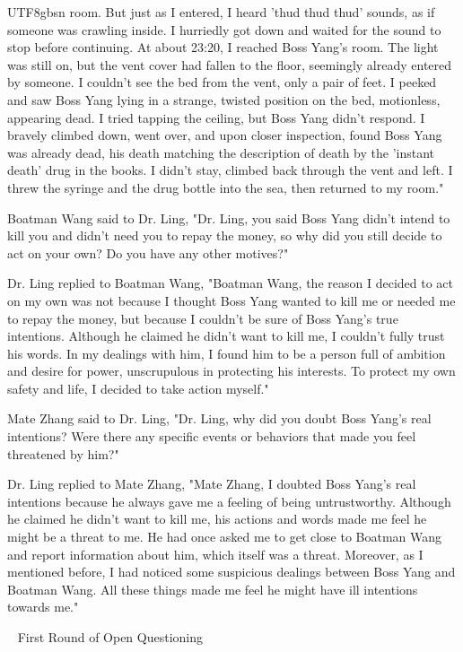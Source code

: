 \documentclass[11pt]{article}
\begin{document}
{\begin{CJK}{UTF8}{gbsn}
room. But just as I entered, I heard 'thud thud thud' sounds, as if someone was crawling inside. I hurriedly got down and waited for the sound to stop before continuing. At about 23:20, I reached Boss Yang's room. The light was still on, but the vent cover had fallen to the floor, seemingly already entered by someone. I couldn’t see the bed from the vent, only a pair of feet. I peeked and saw Boss Yang lying in a strange, twisted position on the bed, motionless, appearing dead. I tried tapping the ceiling, but Boss Yang didn’t respond. I bravely climbed down, went over, and upon closer inspection, found Boss Yang was already dead, his death matching the description of death by the 'instant death' drug in the books. I didn’t stay, climbed back through the vent and left. I threw the syringe and the drug bottle into the sea, then returned to my room."

Boatman Wang said to Dr. Ling, "Dr. Ling, you said Boss Yang didn’t intend to kill you and didn’t need you to repay the money, so why did you still decide to act on your own? Do you have any other motives?"

Dr. Ling replied to Boatman Wang, "Boatman Wang, the reason I decided to act on my own was not because I thought Boss Yang wanted to kill me or needed me to repay the money, but because I couldn’t be sure of Boss Yang’s true intentions. Although he claimed he didn’t want to kill me, I couldn’t fully trust his words. In my dealings with him, I found him to be a person full of ambition and desire for power, unscrupulous in protecting his interests. To protect my own safety and life, I decided to take action myself."

Mate Zhang said to Dr. Ling, "Dr. Ling, why did you doubt Boss Yang's real intentions? Were there any specific events or behaviors that made you feel threatened by him?"

Dr. Ling replied to Mate Zhang, "Mate Zhang, I doubted Boss Yang's real intentions because he always gave me a feeling of being untrustworthy. Although he claimed he didn’t want to kill me, his actions and words made me feel he might be a threat to me. He had once asked me to get close to Boatman Wang and report information about him, which itself was a threat. Moreover, as I mentioned before, I had noticed some suspicious dealings between Boss Yang and Boatman Wang. All these things made me feel he might have ill intentions towards me."

\ \raisedrule[.5ex]{1pt} First Round of Open Questioning \raisedrule[.5ex]{1pt} \



\end{CJK}}
\end{document}
